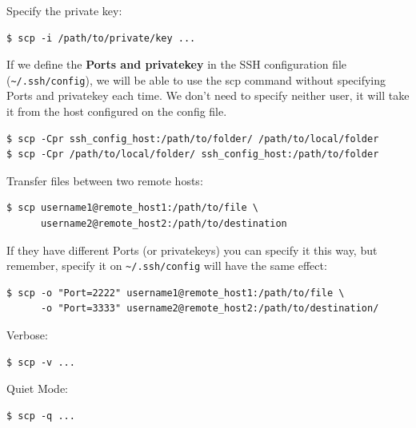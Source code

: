\documentclass{article}
\newenvironment{blocktemplateI}[1]{%
    \tcolorbox[beamer,%
    noparskip,breakable,
    colframe=Violet,%
    colbacklower=Black,%
    title=#1]}%
    {\endtcolorbox}
\newenvironment{blocktemplateII}[1]{%
    \tcolorbox[beamer,%
    noparskip,breakable,
    colframe=Green,%
    colbacklower=LimeGreen!75!LightGreen,%
    title=#1]}%
    {\endtcolorbox}
\newenvironment{codetemplate}[1][]{%
  \mybasecolorbox[#1]
  \itshape
}{%
  \endmybasecolorbox
}
\begin{document}
Specify the private key:
\begin{codetemplate}{}
\begin{verbatim}
$ scp -i /path/to/private/key ...
\end{verbatim}
\end{codetemplate}

\begin{blocktemplateII}{NOTE}
If we define the \textbf{Ports and privatekey} in the SSH configuration file (\verb|~/.ssh/config|),
we will be able to use the scp command without specifying Ports and privatekey each time. We don't need to specify neither user,
it will take it from the host configured on the config file.
\begin{codetemplate}{}
\begin{verbatim}
$ scp -Cpr ssh_config_host:/path/to/folder/ /path/to/local/folder
$ scp -Cpr /path/to/local/folder/ ssh_config_host:/path/to/folder
\end{verbatim}
\end{codetemplate}
\end{blocktemplateII}

Transfer files between two remote hosts:
\begin{codetemplate}{}
\begin{verbatim}
$ scp username1@remote_host1:/path/to/file \ 
      username2@remote_host2:/path/to/destination
\end{verbatim}
\end{codetemplate}

\begin{blocktemplateI}{NOTE}
If they have different Ports (or privatekeys) you can specify it this way, but remember,
specify it on \verb|~/.ssh/config| will have the same effect:
\begin{codetemplate}{}
\begin{verbatim}
$ scp -o "Port=2222" username1@remote_host1:/path/to/file \
      -o "Port=3333" username2@remote_host2:/path/to/destination/
\end{verbatim}
\end{codetemplate}
\end{blocktemplateI}

Verbose:
\begin{codetemplate}{}
\begin{verbatim}
$ scp -v ...
\end{verbatim}
\end{codetemplate}

Quiet Mode:
\begin{codetemplate}{}
\begin{verbatim}
$ scp -q ...
\end{verbatim}
\end{codetemplate}
\end{document}
